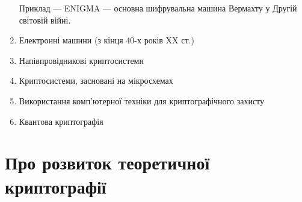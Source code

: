 \begin{enumerate}
        Приклад --- ENIGMA --- основна шифрувальна машина Вермахту
        у Другій світовій війні.
    \item Електронні машини (з кінця 40-х років XX ст.)
    \item Напівпровідникові криптосистеми
    \item Криптосистеми, засновані на мікросхемах
    \item Використання комп'ютерної техніки для криптографічного захисту
    \item Квантова криптографія
\end{enumerate}

\section{Про розвиток теоретичної криптографії}
